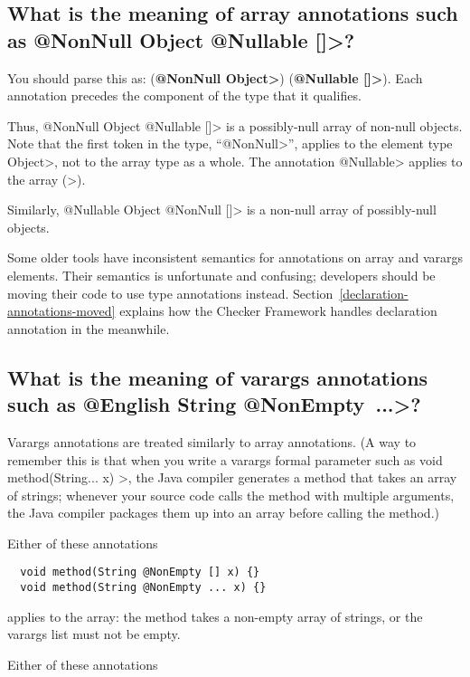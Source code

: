 \subsection{What is the meaning of array annotations such as \<@NonNull Object @Nullable []>?\label{faq-array-syntax-meaning}}

You should parse this as:
(\textbf{\<@NonNull Object>}) (\textbf{\<@Nullable []>}).
Each annotation precedes the component of the type that it qualifies.

Thus,
\<@NonNull Object @Nullable []> is a possibly-null array of non-null
objects.  Note that the first token in the type,
``\<@NonNull>'', applies to the element
type \<Object>, not to the array type as a whole.  The annotation \<@Nullable> applies to the
array (\<[]>).

Similarly,
\<@Nullable Object @NonNull []> is a non-null array of possibly-null
objects.

Some older tools have inconsistent semantics for annotations on array and
varargs elements.  Their semantics is unfortunate and confusing; developers
should be moving their code to use type annotations instead.
Section~\ref{declaration-annotations-moved} explains how the Checker
Framework handles declaration annotation in the meanwhile.


\subsection{What is the meaning of varargs annotations such as \<@English String @NonEmpty~...>?\label{faq-varargs-syntax-meaning}}

Varargs annotations are treated similarly to array annotations.
(A way to remember this is that
when you write a varargs formal parameter such as
\<void method(String... x) \ttlcb\ttrcb>, the Java compiler generates a
method that takes an array of strings; whenever your source code calls the
method with multiple arguments, the Java compiler packages them up into an
array before calling the method.)

Either of these annotations

\begin{Verbatim}
  void method(String @NonEmpty [] x) {}
  void method(String @NonEmpty ... x) {}
\end{Verbatim}

\noindent
applies to the array:  the method takes a non-empty array of strings, or
the varargs list must not be empty.

Either of these annotations

